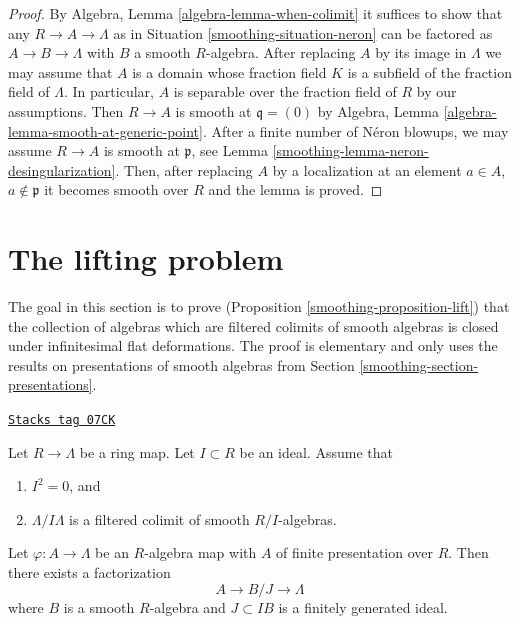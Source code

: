 \begin{proof}

By Algebra, Lemma \ref{algebra-lemma-when-colimit} it suffices to show
that any $R \to A \to \Lambda$ as in Situation \ref{smoothing-situation-neron}
can be factored as $A \to B \to \Lambda$ with $B$ a
smooth $R$-algebra. After replacing $A$ by its image in $\Lambda$
we may assume that $A$ is a domain whose fraction field $K$
is a subfield of the fraction field of $\Lambda$.
In particular, $A$ is separable over the fraction field of $R$
by our assumptions. Then $R \to A$ is smooth at $\mathfrak q = (0)$ by
Algebra, Lemma \ref{algebra-lemma-smooth-at-generic-point}.
After a finite number of N\'eron blowups, we may assume $R \to A$
is smooth at $\mathfrak p$, see Lemma \ref{smoothing-lemma-neron-desingularization}.
Then, after replacing $A$ by a localization
at an element $a \in A$, $a \not \in \mathfrak p$ it becomes
smooth over $R$ and the lemma is proved.
\end{proof}

\section{The lifting problem}
\label{smoothing-section-lifting}
The goal in this section is to prove (Proposition \ref{smoothing-proposition-lift})
that the collection of algebras which are filtered colimits of smooth algebras
is closed under infinitesimal flat deformations. The proof is elementary
and only uses the results on presentations of smooth algebras from
Section \ref{smoothing-section-presentations}.

\begin{lemma}
\label{smoothing-lemma-lift-once}
\href{https://stacks.math.columbia.edu/tag/07CK}{\texttt{Stacks tag 07CK}}

Let $R \to \Lambda$ be a ring map. Let $I \subset R$ be an ideal.
Assume that
\begin{enumerate}
\item $I^2 = 0$, and
\item $\Lambda/I\Lambda$ is a filtered colimit of smooth $R/I$-algebras.
\end{enumerate}
Let $\varphi : A \to \Lambda$ be an $R$-algebra map with $A$ of finite
presentation over $R$. Then there exists a factorization
$$
A \to B/J \to \Lambda
$$
where $B$ is a smooth $R$-algebra and $J \subset IB$ is a finitely generated
ideal.
\end{lemma}

